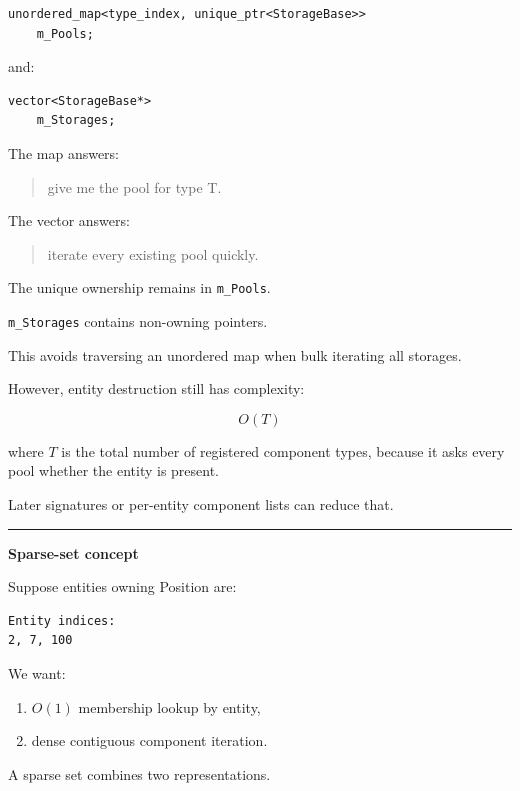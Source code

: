 \begin{verbatim}
unordered_map<type_index, unique_ptr<StorageBase>>
    m_Pools;
\end{verbatim}

and:

\begin{verbatim}
vector<StorageBase*>
    m_Storages;
\end{verbatim}

The map answers:

\begin{quote}
give me the pool for type T.
\end{quote}

The vector answers:

\begin{quote}
iterate every existing pool quickly.
\end{quote}

The unique ownership remains in \texttt{m\_Pools}.

\texttt{m\_Storages} contains non-owning pointers.

This avoids traversing an unordered map when bulk iterating all storages.

However, entity destruction still has complexity:

\[
O(T)
\]

where \(T\) is the total number of registered component types, because it asks every pool whether the entity is present.

Later signatures or per-entity component lists can reduce that.

\begin{center}\rule{0.5\linewidth}{0.5pt}\end{center}

\textbf{Sparse-set concept}

Suppose entities owning Position are:

\begin{verbatim}
Entity indices:
2, 7, 100
\end{verbatim}

We want:

\begin{enumerate}
\def\labelenumi{\arabic{enumi}.}
\tightlist
\item
  \(O(1)\) membership lookup by entity,
\item
  dense contiguous component iteration.
\end{enumerate}

A sparse set combines two representations.

